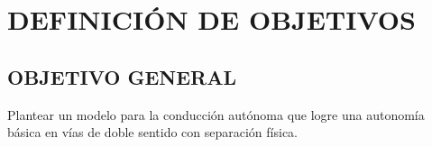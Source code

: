 \section{DEFINICIÓN DE OBJETIVOS}

\subsection{OBJETIVO GENERAL}


Plantear un modelo para la conducción autónoma que logre una autonomía básica en vías de doble sentido con separación física.

